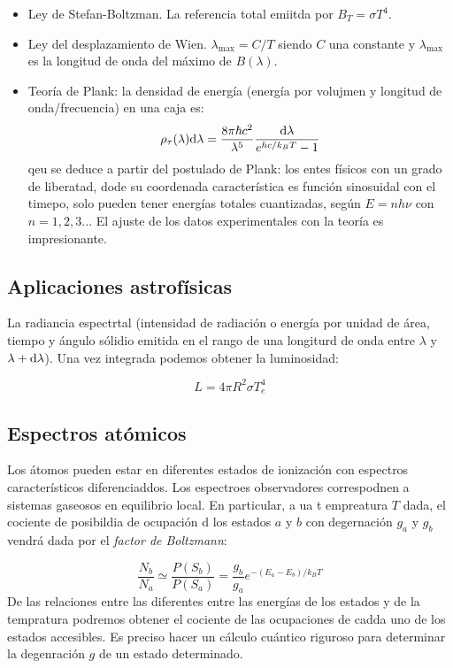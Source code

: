 \begin{itemize}
    \item Ley de Stefan-Boltzman. La referencia total emiitda por $B_T = \sigma T^4$. 
    \item Ley del desplazamiento de Wien. $\lambda_{\max} = C / T$ siendo $C$ una constante y $\lambda_{\max}$ es la longitud de onda del máximo de $B(\lambda)$. 
    \item Teoría de Plank: la densidad de energía (energía por volujmen y longitud de onda/frecuencia) en una caja es:
    \begin{equation}
        \rho_\tau (\lambda) \mathrm{d} \lambda = \frac{8 \pi \hbar c^2}{\lambda^5} \frac{\mathrm{d} \lambda}{e^{hc/k_BT}-1}
    \end{equation}
    qeu se deduce a partir del postulado de Plank: los entes físicos con un grado de liberatad, dode su coordenada característica es función sinosuidal con el timepo, solo pueden tener energías totales cuantizadas, según $E=n h \nu$ con $n=1,2,3...$ El ajuste de los datos experimentales con la teoría es impresionante. 
\end{itemize}

\subsection{Aplicaciones astrofísicas}

La radiancia espectrtal (intensidad de radiación o energía por unidad de área, tiempo y ángulo sólidio emitida en el rango de una longiturd de onda entre $\lambda$ y $\lambda + \mathrm{d} \lambda$). Una vez integrada podemos obtener la luminosidad:

\begin{equation}
    L = 4 \pi R^2 \sigma T^4_e
\end{equation}

\subsection{Espectros atómicos}

Los átomos pueden estar en diferentes estados de ionización con espectros característicos diferenciaddos. Los espectroes observadores correspodnen a sistemas gaseosos en equilibrio local. En particular, a ua t empreatura $T$ dada, el cociente de posibildia de ocupación d los estados $a$ y $b$ con degernación  $g_a$ y $g_b$ vendrá dada por el \textit{factor de Boltzmann}: 

\begin{equation}
    \frac{N_b}{N_a} \simeq \frac{P(S_b)}{P(S_a)} = \frac{g_b}{g_a} e^{-(E_a-E_b)/k_BT}
\end{equation}
De las relaciones entre las diferentes entre las energías de los estados y de la tempratura podremos obtener el cociente de las ocupaciones de cadda uno de los estados accesibles. Es preciso hacer un cálculo cuántico riguroso para determinar la degenración $g$ de un estado determinado. 

